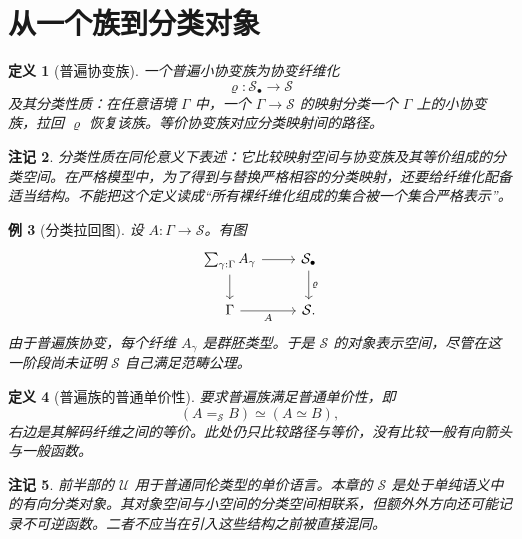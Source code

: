 \documentclass[12pt,oneside,openany,fontset=none]{ctexbook}
\theoremstyle{cn}
\newtheorem{definition}{定义}[chapter]
\newtheorem{example}[definition]{例}
\newtheorem{remark}[definition]{注记}
\numberwithin{equation}{chapter}
\newcommand{\Sp}{\mathcal S}
\newcommand{\U}{\mathcal U}
\begin{document}
\section{从一个族到分类对象}
\begin{definition}[普遍协变族]
一个普遍小协变族为协变纤维化
\[
\varrho:\Sp_\bullet\longrightarrow\Sp
\]
及其分类性质：在任意语境 $\Gamma$ 中，一个 $\Gamma\to\Sp$ 的映射分类一个 $\Gamma$ 上的小协变族，拉回 $\varrho$ 恢复该族。等价协变族对应分类映射间的路径。
\end{definition}
\begin{remark}
分类性质在同伦意义下表述：它比较映射空间与协变族及其等价组成的分类空间。在严格模型中，为了得到与替换严格相容的分类映射，还要给纤维化配备适当结构。不能把这个定义读成“所有裸纤维化组成的集合被一个集合严格表示”。
\end{remark}
\begin{example}[分类拉回图]
设 $A:\Gamma\to\Sp$。有图
\[
\begin{tikzcd}
\sum_{\gamma:\Gamma}A_\gamma\ar[r]\ar[d]&\Sp_\bullet\ar[d,"\varrho"]\\
\Gamma\ar[r,"A"']&\Sp.
\end{tikzcd}
\]
由于普遍族协变，每个纤维 $A_\gamma$ 是群胚类型。于是 $\Sp$ 的对象表示空间，尽管在这一阶段尚未证明 $\Sp$ 自己满足范畴公理。
\end{example}
\begin{definition}[普遍族的普通单价性]
要求普遍族满足普通单价性，即
\[
(A=_\Sp B)\simeq(A\simeq B),
\]
右边是其解码纤维之间的等价。此处仍只比较路径与等价，没有比较一般有向箭头与一般函数。
\end{definition}
\begin{remark}
前半部的 $\U$ 用于普通同伦类型的单价语言。本章的 $\Sp$ 是处于单纯语义中的有向分类对象。其对象空间与小空间的分类空间相联系，但额外外方向还可能记录不可逆函数。二者不应当在引入这些结构之前被直接混同。
\end{remark}
\end{document}
